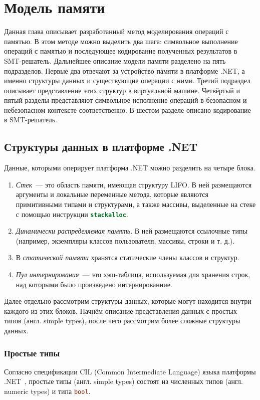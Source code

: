 \section{Модель памяти}

Данная глава описывает разработанный метод моделирования операций с памятью. В этом методе можно выделить два шага: символьное выполнение операций с памятью и последующее кодирование полученных результатов в SMT-решатель. Дальнейшее описание модели памяти разделено на пять подразделов. Первые два отвечают за устройство памяти в платформе .NET, а именно структуры данных и существующие операции с ними. Третий подраздел описывает представление этих структур в виртуальной машине. Четвёртый и пятый разделы представляют символьное исполнение операций в безопасном и небезопасном контексте соответственно. В шестом разделе описано кодирование в SMT-решатель.

\subsection{Структуры данных в платформе .NET}

Данные, которыми оперирует платформа .NET можно разделить на четыре блока.
\begin{enumerate}
    \item \emph{Стек}~--- это область памяти, имеющая структуру LIFO. В ней размещаются аргументы и локальные переменные метода, которые являются примитивными типами и структурами, а также массивы, выделенные на стеке с помощью инструкции \lstinline[language=csharp]{stackalloc}.
    \item \emph{Динамически распределяемая память}. В ней размещаются ссылочные типы (например, экземпляры классов пользователя, массивы, строки и т. д.).
    \item В \emph{статической памяти} хранятся статические члены классов и структур.
    \item \emph{Пул интернирования}~--- это хэш-таблица, используемая для хранения строк, над которыми было произведено интернированние.
\end{enumerate}

Далее отдельно рассмотрим структуры данных, которые могут находится внутри каждого из этих блоков. Начнём описание представления данных с простых типов (англ. simple types), после чего рассмотрим более сложные структуры данных.

\subsubsection{Простые типы}
Согласно спецификации CIL (Common Intermediate Language) языка платформы .NET~\cite{ecmatg3}, простые типы (англ. simple types) состоят из численных типов (англ. numeric types) и типа \lstinline[language=csharp]{bool}.


